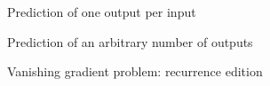\begin{frame}{Prediction of one output per input}
\end{frame}

\begin{frame}{Prediction of an arbitrary number of outputs}
\end{frame}

\begin{frame}{Vanishing gradient problem: recurrence edition}
\end{frame}
